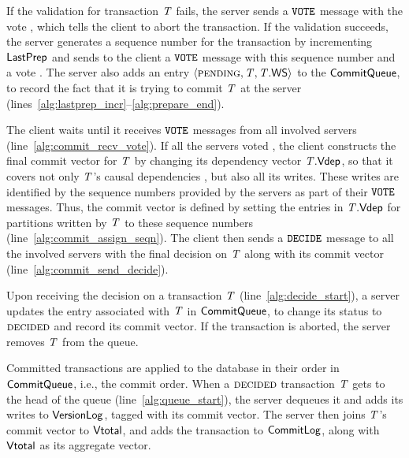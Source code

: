 If the validation for transaction $\mathit{T}$ fails, the server sends a ${\tt VOTE}$ message with the vote \abort, which tells the client to abort the transaction. If the validation succeeds, the server generates a sequence number for the transaction by incrementing $\mathsf{LastPrep}$ and sends to the client a ${\tt VOTE}$ message with this sequence number and a vote \commit. The server also adds an entry $\langle \text{\sc pending}, \mathit{T}, \mathit{T}.\mathsf{WS} \rangle$ to the $\mathsf{CommitQueue}$, to record the fact that it is trying to commit $\mathit{T}$ at the server (lines~\ref{alg:lastprep_incr}--\ref{alg:prepare_end}).

The client waits until it receives ${\tt VOTE}$ messages from all involved servers (line~\ref{alg:commit_recv_vote}). If all the servers voted \commit, the client constructs the final commit vector for $\mathit{T}$ by changing its dependency vector $\mathit{T}.\mathsf{Vdep}$, so that it covers not only $\mathit{T}$'s causal dependencies , but also all its writes. These writes are identified by the sequence numbers provided by the servers as part of their ${\tt VOTE}$ messages. Thus, the commit vector is defined by setting the entries in $\mathit{T}.\mathsf{Vdep}$ for partitions written by $\mathit{T}$ to these sequence numbers (line~\ref{alg:commit_assign_seqn}). The client then sends a ${\tt DECIDE}$ message to all the involved servers with the final decision on $\mathit{T}$ along with its commit vector (line~\ref{alg:commit_send_decide}).

Upon receiving the decision on a transaction $\mathit{T}$ (line~\ref{alg:decide_start}), a server updates the entry associated with $\mathit{T}$ in $\mathsf{CommitQueue}$, to change its status to $\text{\sc decided}$ and record its commit vector. If the transaction is aborted, the server removes $\mathit{T}$ from the queue.

Committed transactions are applied to the database in their order in $\mathsf{CommitQueue}$, i.e., the commit order. When a $\text{\sc decided}$ transaction $\mathit{T}$ gets to the head of the queue (line~\ref{alg:queue_start}), the server dequeues it and adds its writes to $\mathsf{VersionLog}$, tagged with its commit vector. The server then joins $\mathit{T}$'s commit vector to $\mathsf{Vtotal}$, and adds the transaction to $\mathsf{CommitLog}$, along with $\mathsf{Vtotal}$ as its aggregate vector.


